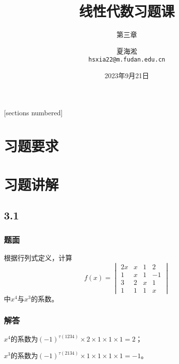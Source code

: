 \documentclass[10pt,xcolor=svgnames]{beamer} %
\title{线性代数习题课}
\author[夏海淞]{夏海淞\\ \texttt{hsxia22@m.fudan.edu.cn}}
\subtitle{第三章}
\institute[复旦大学]{计算机科学技术学院\\ 复旦大学}
\date[2023/9/21]{2023年9月21日}
\begin{document}
{
\maketitle
}%


\begin{frame}
    [sections numbered] %
    \tableofcontents[hideallsubsections] %
\end{frame}

\section{习题要求}

\section{习题讲解}

\subsection*{3.1}
\begin{frame}
    \frametitle{题面}
    根据行列式定义，计算
    \begin{equation*}
        f(x)=
        \begin{vmatrix}
            2x & x & 1 & 2  \\
            1  & x & 1 & -1 \\
            3  & 2 & x & 1  \\
            1  & 1 & 1 & x
        \end{vmatrix}
    \end{equation*}
    中\(x^4\)与\(x^3\)的系数。
\end{frame}
\begin{frame}
    \frametitle{解答}
    \(x^4\)的系数为\((-1)^{\tau(1234)}\times2\times1\times1\times1=2\)；

    \(x^3\)的系数为\((-1)^{\tau(2134)}\times1\times1\times1\times1=-1\)。
\end{frame}
\end{document}
